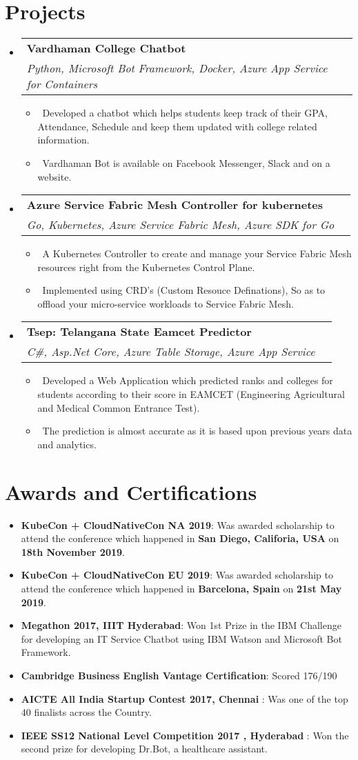 \documentclass[letterpaper,11pt]{article}
\makeatletter
\newcommand{\resumeItem}[2]{
  \item\small{
    \textbf{#1}{: #2 \vspace{-2pt}}
  }
}
\newcommand{\resumeMyItem}[1]{
  \item\small{
    \ #1 \vspace{-2pt}
  }
}
\newcommand{\resumeSubheading}[4]{
  \vspace{-1pt}\item
    \begin{tabular*}{0.97\textwidth}{l@{\extracolsep{\fill}}r}
      \textbf{#1} & #2 \\
      \textit{\small#3} & \textit{\small #4} \\
    \end{tabular*}\vspace{-5pt}
}
\newcommand{\resumeSubItem}[2]{\resumeItem{#1}{#2}\vspace{-4pt}}
\newcommand{\resumeSubHeadingListStart}{\begin{itemize}[leftmargin=*]}
\newcommand{\resumeSubHeadingListEnd}{\end{itemize}}
\newcommand{\resumeItemListStart}{\begin{itemize}}
\newcommand{\resumeItemListEnd}{\end{itemize}\vspace{-5pt}}
\makeatother
\begin{document}
\section{Projects}
  \resumeSubHeadingListStart

  \resumeSubheading
  {Vardhaman College Chatbot}{}
  {Python, Microsoft Bot Framework, Docker, Azure App Service for Containers}{}
  \resumeItemListStart
    \resumeMyItem{Developed a chatbot which helps students keep track of their GPA, Attendance, Schedule and keep them updated with college related information.}
    \resumeMyItem{Vardhaman Bot is available on Facebook Messenger, Slack and on a website.}
  \resumeItemListEnd

    \resumeSubheading
      {Azure Service Fabric Mesh Controller for kubernetes}{}
      {Go, Kubernetes, Azure Service Fabric Mesh, Azure SDK for Go}{}
      \resumeItemListStart
        \resumeMyItem{A Kubernetes Controller to create and manage your Service Fabric Mesh resources right from the Kubernetes Control Plane.}
        \resumeMyItem{Implemented using CRD's (Custom Resouce Definations), So as to offload your micro-service workloads to Service Fabric Mesh.}
        \resumeItemListEnd

    \resumeSubheading
      {Tsep: Telangana State Eamcet Predictor}{}
      {C\#, Asp.Net Core, Azure Table Storage, Azure App Service}{}
      \resumeItemListStart
        \resumeMyItem{Developed a Web Application which predicted ranks and colleges for students according to their score in EAMCET (Engineering Agricultural and Medical Common Entrance Test).}
        \resumeMyItem{The prediction is almost accurate as it is based upon previous years data and analytics.}
      \resumeItemListEnd
    \resumeSubHeadingListEnd
\section{Awards and Certifications}
  \resumeSubHeadingListStart
  \resumeSubItem{KubeCon + CloudNativeCon NA 2019}{Was awarded scholarship to attend the conference which happened in \textbf{San Diego, Califoria, USA} on \textbf{18th November 2019}.}
    \resumeSubItem{KubeCon + CloudNativeCon EU 2019}{Was awarded scholarship to attend the conference which happened in \textbf{Barcelona, Spain} on \textbf{21st May 2019}.}
    \resumeSubItem{Megathon 2017, IIIT Hyderabad}
      {Won 1st Prize in the IBM Challenge for developing an IT Service Chatbot using IBM Watson and Microsoft Bot Framework.}
      \resumeSubItem{Cambridge Business English Vantage Certification}
      {Scored  176/190 }
      \resumeSubItem{AICTE All India Startup Contest 2017, Chennai }
      {Was one of the top 40 finalists across the Country.}
      \resumeSubItem{IEEE SS12 National Level Competition 2017 , Hyderabad }
      {Won the second prize for developing Dr.Bot, a healthcare assistant.}
  \resumeSubHeadingListEnd
\end{document}

